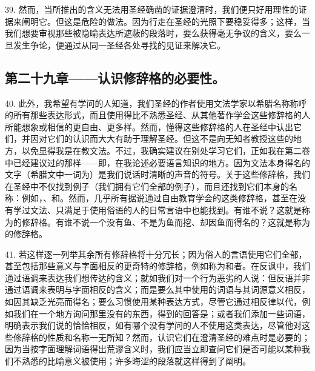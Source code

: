 39. 然而，当所推出的含义无法用圣经确凿的证据澄清时，我们便只好用理性的证据来阐明它。但这是危险的做法。因为行走在圣经的光照下要稳妥得多；这样，当我们想要审视那些被隐喻表达所遮蔽的段落时，要么获得毫无争议的含义，要么一旦发生争论，便通过从同一圣经各处寻找的见证来解决它。\par


\subsection{第二十九章——认识修辞格的必要性。}

40. 此外，我希望有学问的人知道，我们圣经的作者使用文法学家以希腊名称称呼的所有那些表达形式，而且使用得比不熟悉圣经、从其他著作学会这些修辞格的人所能想象或相信的更自由、更多样。然而，懂得这些修辞格的人在圣经中认出它们，并因对它们的认识而大大有助于理解圣经。但这不是向无知者教授这些的地方，以免显得我是在教文法。不过，我确实建议在别处学习它们，正如我在第二卷中已经建议过的那样——即，在我论述必要语言知识的地方。因为文法本身得名的文字（希腊文中一词为）是我们说话时清晰的声音的符号。关于这些修辞格，我们在圣经中不仅找到例子（我们拥有它们全部的例子），而且还找到它们本身的名称：例如，、和。然而，几乎所有据说通过自由教育学会的这类修辞格，甚至在没有学过文法、只满足于使用俗语的人的日常言语中也能找到。有谁不说？这就是称为的修辞格。有谁不说一个没有鱼、不是为鱼而挖、却因鱼而得名的？这就是称为的修辞格。\par

41. 若这样逐一列举其余所有修辞格将十分冗长；因为俗人的言语使用它们全部，甚至包括那些意义与字面相反的更奇特的修辞格，例如称为和者。在反讽中，我们通过语调来表达我们想传达的含义；就如我们对一个行为恶劣的人说：但反语并非通过语调来表明与字面相反的含义；而是要么其中使用的词语与其词源意义相反，如因其缺乏光亮而得名；要么习惯使用某种表达方式，尽管它通过相反律以代，例如我们在一个地方询问那里没有的东西，得到的回答是；或者我们添加一些词语，明确表示我们说的恰恰相反，如有哪个没有学问的人不使用这类表达，尽管他对这些修辞格的性质和名称一无所知？然而，认识它们在澄清圣经的难点时是必要的；因为当按字面理解词语得出荒谬含义时，我们应当立即查问它们是否可能以某种我们不熟悉的比喻意义被使用；许多晦涩的段落就这样得到了阐明。\par

